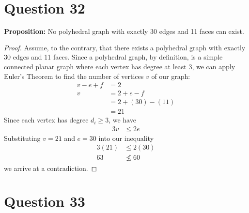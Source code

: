 \documentclass[11pt, oneside]{article}   	%
\begin{document}
\section*{Question 32}

\textbf{Proposition:} No polyhedral graph with exactly 30 edges and 11 faces can exist.

\begin{proof}
Assume, to the contrary, that there exists a polyhedral graph with exactly 30 edges and 11 faces. Since a polyhedral graph, by definition, is a simple connected planar graph where each vertex has degree at least 3, we can apply Euler's Theorem to find the number of vertices $v$ of our graph:
\begin{align*}
	v-e+f & =2 \\
	v & = 2 + e -f \\
	& = 2+(30)-(11) \\
	& = 21
\end{align*}
Since each vertex has degree $d_i \geq 3$, we have
\begin{align*}
	3v & \leq 2e
\end{align*}
Substituting $v=21$ and $e=30$ into our inequality
\begin{align*}
	3(21) & \leq 2 (30) \\
	63 & \nleq 60
\end{align*}
we arrive at a contradiction.
\end{proof}


\cleardoublepage
\section*{Question 33}
\end{document}
